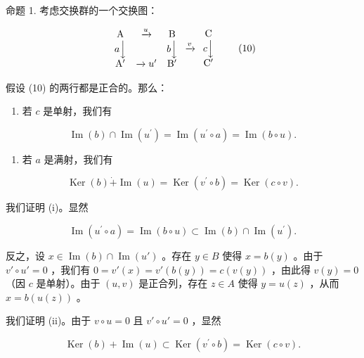 命题 1. 考虑交换群的一个交换图：

\[
\begin{array}{c c c} \mathrm{A} & \xrightarrow {u} & \mathrm{B} \\ a \Big \downarrow & & b \Big \downarrow \\ \mathrm{A} ^ {\prime} & \xrightarrow {} u ^ {\prime} & \mathrm{B} ^ {\prime} \end{array} \xrightarrow {v} \begin{array}{c c c} \mathrm{C} \\ c \Big \downarrow \\ \mathrm{C} ^ {\prime} \end{array}\tag{10}
\]

假设 (10) 的两行都是正合的。那么：

\begin{enumerate}
\def\labelenumi{(\roman{enumi})}
\tightlist
\item
  若 \(c\) 是单射，我们有
\end{enumerate}

\[
\operatorname{Im} (b) \cap \operatorname{Im} (u ^ {\prime}) = \operatorname{Im} (u ^ {\prime} \circ a) = \operatorname{Im} (b \circ u).\tag{11}
\]

\begin{enumerate}
\def\labelenumi{(\roman{enumi})}
\setcounter{enumi}{1}
\tightlist
\item
  若 \(a\) 是满射，我们有
\end{enumerate}

\[
\operatorname{Ker} (b) \dot {+} \operatorname{Im} (u) = \operatorname{Ker} (v ^ {\prime} \circ b) = \operatorname{Ker} (c \circ v).\tag{12}
\]

我们证明 (i)。显然

\[
\operatorname{Im} (u ^ {\prime} \circ a) = \operatorname{Im} (b \circ u) \subset \operatorname{Im} (b) \cap \operatorname{Im} (u ^ {\prime}).
\]

反之，设 \(x \in \operatorname{Im}(b) \cap \operatorname{Im}(u')\) 。存在 \(y \in B\) 使得 \(x = b(y)\) 。由于 \(v' \circ u' = 0\) ，我们有 \(0 = v'(x) = v'(b(y)) = c(v(y))\) ，由此得 \(v(y) = 0\) （因 \(c\) 是单射）。由于 \((u, v)\) 是正合列，存在 \(z \in A\) 使得 \(y = u(z)\) ，从而 \(x = b(u(z))\) 。

我们证明 (ii)。由于 \(v \circ u = 0\) 且 \(v' \circ u' = 0\) ，显然

\[
\operatorname{Ker} (b) + \operatorname{Im} (u) \subset \operatorname{Ker} (v ^ {\prime} \circ b) = \operatorname{Ker} (c \circ v).
\]

